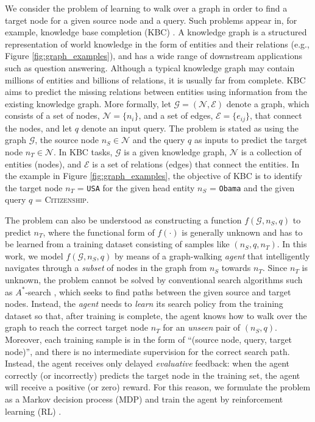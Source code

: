 \documentclass{article}
\newcommand{\mc}{\mathcal}
\begin{document}
	We consider the problem of learning to walk over a graph in order to find a target node for a given source node and a query. Such problems appear in, for example, knowledge base completion (KBC) \cite{DeepPath,lin2015learning,trouillon2017knowledge,NickelTrKr11,gaosurvey}. A knowledge graph is a structured representation of world knowledge in the form of entities and their relations (e.g., Figure \ref{fig:graph_examples}), and has a wide range of downstream applications such as question answering. Although a typical knowledge graph may contain millions of entities and billions of relations, it is usually far from complete. KBC aims to predict the missing relations between entities using information from the existing knowledge graph.
	More formally, let $\mc{G} = (\mc{N},\mc{E})$ denote a graph, which consists of a set of nodes, $\mc{N}=\{n_{i}\}$, and a set of edges, $\mc{E}=\{e_{ij}\}$, that connect the nodes, and let $q$ denote an input query. The problem is stated as using the graph $\mc{G}$, the source node $n_S \in \mc{N}$ and the query $q$ as inputs to predict the target node $n_T \in \mc{N}$. In KBC tasks, $\mc{G}$ is a given knowledge graph, $\mc{N}$ is a collection of entities (nodes), and $\mc{E}$ is a set of relations (edges) that connect the entities. In the example in Figure \ref{fig:graph_examples}, the objective of KBC is to identify the target node $n_T$ = \texttt{USA} for the given head entity $n_S$ = \texttt{Obama} and the given query $q$ = \textsc{Citizenship}.
	
	
	The problem can also be understood as constructing a function $f(\mc{G}, n_S, q)$ to predict $n_T$, where the functional form of $f(\cdot)$ is generally unknown and has to be learned from a training dataset consisting of samples like $(n_S, q, n_T)$. In this work, we model $f(\mc{G}, n_S, q)$ by means of a graph-walking \emph{agent} that intelligently navigates through a \emph{subset} of nodes in the graph from $n_S$ towards $n_T$. Since $n_T$ is unknown, the problem cannot be solved by conventional search algorithms such as $A^*$-search \cite{hart1968formal}, which seeks to find paths between the given source and target nodes. Instead, the \emph{agent} needs to \emph{learn} its search policy from the training dataset so that, after training is complete, the agent knows how to walk over the graph to reach the correct target node $n_T$ for an \emph{unseen} pair of $(n_S, q)$. Moreover, each training sample is in the form of ``(source node, query, target node)'', and there is no intermediate supervision for the correct search path. Instead, the agent receives only delayed \emph{evaluative} feedback: when the agent correctly (or incorrectly) predicts the target node in the training set, the agent will receive a positive (or zero) reward. For this reason, we formulate the problem as a Markov decision process (MDP) and train the agent by reinforcement learning (RL) \cite{sutton1998reinforcement}. 
	
\end{document}

